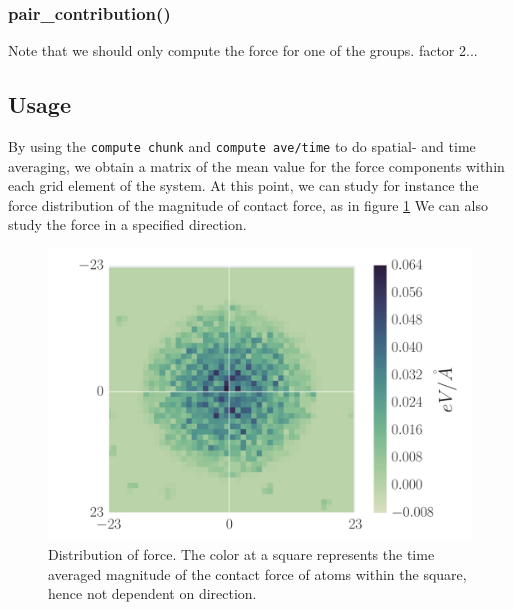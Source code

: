 \documentclass[twoside,english]{uiofysmaster}
\begin{document}
\subsubsection{pair\_contribution()}



{\color{editColor}Note that we should only compute the force for one of the groups. factor 2...}

\subsection{Usage}

By using the \texttt{compute chunk} and \texttt{compute ave/time} to do spatial- and time averaging, 
we obtain a matrix of the mean value for the force components within each grid element of the system.
At this point, we can study for instance the force distribution of the magnitude of contact force, as in figure \ref{fig:absoluteDistribution} 
We can also study the force in a specified direction.

\begin{figure}
	\centering
	\includegraphics[width=0.8\linewidth]{figures/forceDistribution/forces/absoluteForceDistribution.pdf}
	\caption{Distribution of force. The color at a square represents the time averaged magnitude of the contact force of atoms within the square, hence not dependent on direction.}
	\label{fig:absoluteDistribution}
\end{figure}





\newpage
\end{document}
